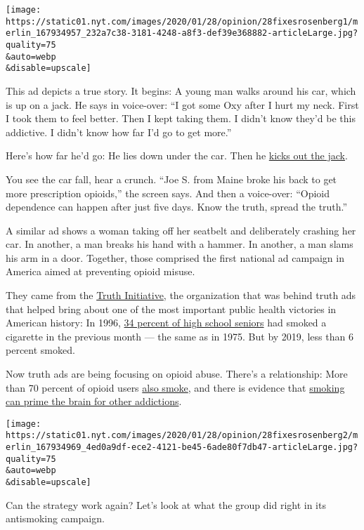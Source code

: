 \texttt{[image: https://static01.nyt.com/images/2020/01/28/opinion/28fixesrosenberg1/merlin\_167934957\_232a7c38-3181-4248-a8f3-def39e368882-articleLarge.jpg?quality=75\\\&auto=webp\\\&disable=upscale]}

This ad depicts a true story. It begins: A young man walks around his
car, which is up on a jack. He says in voice-over: ``I got some Oxy
after I hurt my neck. First I took them to feel better. Then I kept
taking them. I didn't know they'd be this addictive. I didn't know how
far I'd go to get more.''

Here's how far he'd go: He lies down under the car. Then he
\href{https://www.thetruth.com/o/articles/joe}{kicks out the jack}.

You see the car fall, hear a crunch. ``Joe S. from Maine broke his back
to get more prescription opioids,'' the screen says. And then a
voice-over: ``Opioid dependence can happen after just five days. Know
the truth, spread the truth.''

A similar ad shows a woman taking off her seatbelt and deliberately
crashing her car. In another, a man breaks his hand with a hammer. In
another, a man slams his arm in a door. Together, those comprised the
first national ad campaign in America aimed at preventing opioid misuse.

They came from the \href{http://www.truthinitiative.org}{Truth
Initiative}, the organization that was behind truth ads that helped
bring about one of the most important public health victories in
American history: In 1996,
\href{https://www.washingtonpost.com/archive/politics/1997/11/02/officials-seek-a-path-to-cut-into-haze-of-youth-smoking/bdfdf1a0-4c3e-433c-844c-8eca9b746253/}{34
percent of high school seniors} had smoked a cigarette in the previous
month --- the same as in 1975. But by 2019, less than 6 percent smoked.

Now truth ads are being focusing on opioid abuse. There's a
relationship: More than 70 percent of opioid users
\href{https://www.ncbi.nlm.nih.gov/pmc/articles/PMC4990064/}{also
smoke}, and there is evidence that
\href{https://www.sciencedirect.com/science/article/pii/S0091743519303214}{smoking
can prime the brain for other addictions}.

\texttt{[image: https://static01.nyt.com/images/2020/01/28/opinion/28fixesrosenberg2/merlin\_167934969\_4ed0a9df-ece2-4121-be45-6ade80f7db47-articleLarge.jpg?quality=75\\\&auto=webp\\\&disable=upscale]}

Can the strategy work again? Let's look at what the group did right in
its antismoking campaign.

